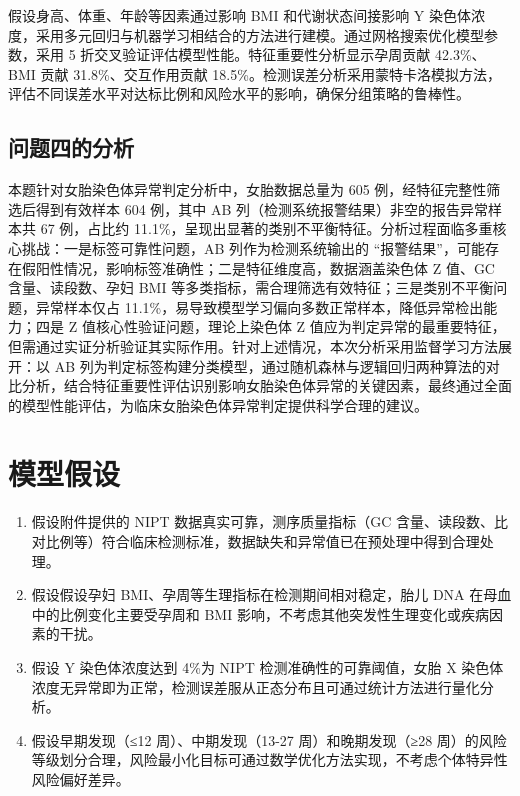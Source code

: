 \documentclass[withoutpreface,bwprint]{cumcmthesis} %
\begin{document}
假设身高、体重、年龄等因素通过影响 BMI 和代谢状态间接影响 Y 染色体浓度，采用多元回归与机器学习相结合的方法进行建模。通过网格搜索优化模型参数，采用 5 折交叉验证评估模型性能。特征重要性分析显示孕周贡献 42.3\%、BMI 贡献 31.8\%、交互作用贡献 18.5\%。检测误差分析采用蒙特卡洛模拟方法，评估不同误差水平对达标比例和风险水平的影响，确保分组策略的鲁棒性。

\subsection{问题四的分析}
本题针对女胎染色体异常判定分析中，女胎数据总量为 605 例，经特征完整性筛选后得到有效样本 604 例，其中 AB 列（检测系统报警结果）非空的报告异常样本共 67 例，占比约 11.1\%，呈现出显著的类别不平衡特征。分析过程面临多重核心挑战：一是标签可靠性问题，AB 列作为检测系统输出的 “报警结果”，可能存在假阳性情况，影响标签准确性；二是特征维度高，数据涵盖染色体 Z 值、GC 含量、读段数、孕妇 BMI 等多类指标，需合理筛选有效特征；三是类别不平衡问题，异常样本仅占 11.1\%，易导致模型学习偏向多数正常样本，降低异常检出能力；四是 Z 值核心性验证问题，理论上染色体 Z 值应为判定异常的最重要特征，但需通过实证分析验证其实际作用。针对上述情况，本次分析采用监督学习方法展开：以 AB 列为判定标签构建分类模型，通过随机森林与逻辑回归两种算法的对比分析，结合特征重要性评估识别影响女胎染色体异常的关键因素，最终通过全面的模型性能评估，为临床女胎染色体异常判定提供科学合理的建议。

\section{模型假设}
\begin{enumerate}
    \item 假设附件提供的 NIPT 数据真实可靠，测序质量指标（GC 含量、读段数、比对比例等）符合临床检测标准，数据缺失和异常值已在预处理中得到合理处理。
    \item 假设假设孕妇 BMI、孕周等生理指标在检测期间相对稳定，胎儿 DNA 在母血中的比例变化主要受孕周和 BMI 影响，不考虑其他突发性生理变化或疾病因素的干扰。
    \item 假设 Y 染色体浓度达到 4\%为 NIPT 检测准确性的可靠阈值，女胎 X 染色体浓度无异常即为正常，检测误差服从正态分布且可通过统计方法进行量化分析。
    \item 假设早期发现（≤12 周）、中期发现（13-27 周）和晚期发现（≥28 周）的风险等级划分合理，风险最小化目标可通过数学优化方法实现，不考虑个体特异性风险偏好差异。
\end{enumerate}

\end{document}
